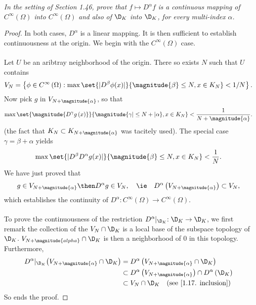 \textit{In the setting of Section 1.46, prove that 
    $f \mapsto D^{\alpha}f$ 
is a continuous mapping of 
%
  $C^{\infty}\left(\Omega\right)$ into 
  $C^{\infty}\left(\Omega\right)$ and also of 
  $\D_{K}$ into 
  $\D_{K}$, for every multi-index $\alpha$.
%
}
\begin{proof} 
In both cases, $D^\alpha$ is a linear mapping. 
It is then sufficient to establish continuousness at the origin.
%
We begin with the $C^\infty\left(\Omega\right)$ case. \\
\\
Let $U$ be an aribtray neighborhood of the origin.
There so exists $N$ such that $U$ contains
%
  \begin{align} 
    V_{N}= \left\{
      \phi \in C^\infty\left(\Omega\right): 
      \max\set{
        | D^\beta\phi (x) |
      }{
        \magnitude{ \beta } \leq N, x\in K_N
      }
    < 1/N
    \right\}.
  \end{align}
%
Now pick $g$ in $V_{N+\magnitude{\alpha}}$, so that
%
  \begin{align}
    \max
    \set{
      \magnitude{ D^\gamma g\left(x\right) }
    }{
      \magnitude{ \gamma | \leq N+| \alpha }, 
      x\in K_{N}
    }
    < \frac{1}{N+\magnitude{\alpha}}.
  \end{align}
%
(the fact that $K_N\subset K_{N+\magnitude{\alpha}}$ was tacitely used).
%
The special case $\gamma = \beta + \alpha$ yields
\begin{align}
    \max
    \set{
      | D^\beta D^\alpha g(x)|
    }{
      \magnitude{\beta} \leq N, 
      x\in K_{N}
    }
    < \frac{1}{N}.
  \end{align}
%
We have just proved that
%
  \begin{align}\label{1.17. inclusion}
    g \in V_{N + \magnitude{\alpha}}
      \then 
    D^\alpha g \in V_{N},
      \quad
      \ie
      \quad
    D^\alpha \left(V_{N+\magnitude{\alpha}}\right) \subset V_N,
  \end{align}
%
which establishes the continuity of %
%
  $D^{\alpha}: C^\infty \left(\Omega\right)\to C^\infty \left(\Omega\right)$. %
%
\\\\
To prove the continuousness of the restriction 
%
  $D^\alpha \lvert_{\D_K}: \D_K \to \D_K$, %
%
%
we first remark the collection of the  
%
  ${V_N \cap \D_K}$ %
%
is a local base of the subspace topology of $\D_K$.
%
%
  $V_{N+\magnitude{alpha}} \cap \D_K$ %
%
is then a neighborhood of $0$ in this topology. %
Furthermore, 
%
  \begin{align}
    D^\alpha \lvert_{\D_K} \left(V_{N+\magnitude{\alpha}} \cap \D_K\right) 
    & = 
      D^\alpha\left(V_{N+\magnitude{\alpha}} \cap \D_K\right) \\
    & \subset
      D^\alpha\left(V_{N+\magnitude{\alpha}}\right) 
        \cap 
      D^\alpha\left(\D_K\right) \\
    & \subset 
      V_N 
        \cap 
      \D_K
          \quad (\text{see }\ref{1.17. inclusion})
  \end{align}
%
So ends the proof.
\end{proof}
